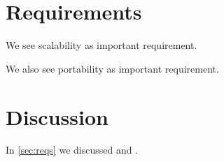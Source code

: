 \documentclass{article}
\begin{document}
\newcommand{\enumReq}{CR}
\newcounter{\enumReq}

\section{Requirements}
\label{sec:reqs}
We see scalability as important requirement.

We also see portability as important requirement.

\section{Discussion}
In \autoref{sec:reqs} we discussed  and .
\end{document}
